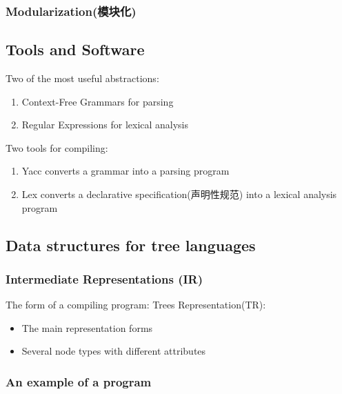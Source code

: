 \subsubsection{Modularization(模块化)}

\subsection{Tools and Software}
Two of the most useful abstractions:
\begin{enumerate}
    \item Context-Free Grammars for parsing
    \item Regular Expressions for lexical analysis
\end{enumerate}

Two tools for compiling:
\begin{enumerate}
    \item Yacc converts a grammar into a parsing program
    \item Lex converts a declarative specification(声明性规范) into a lexical analysis program
\end{enumerate}

\subsection{Data structures for tree languages}

\subsubsection{Intermediate Representations (IR)}
The form of a compiling program: Trees Representation(TR):
\begin{itemize}
    \item The main representation forms
    \item Several node types with different attributes
\end{itemize}

\subsubsection{An example of a program}


